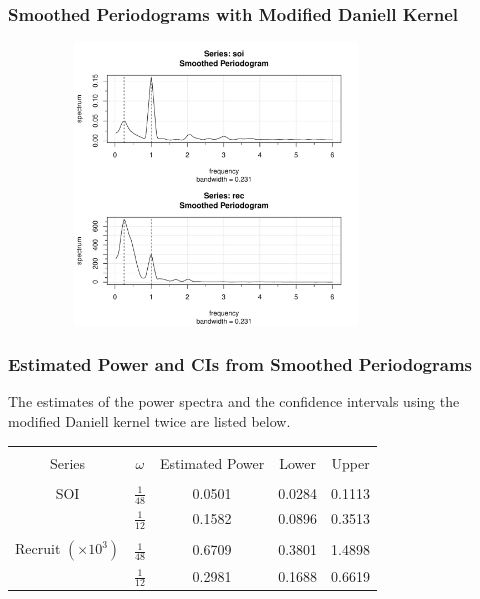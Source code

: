 \documentclass[%
xcolor=pdftex]{beamer}
\begin{document}
\begin{frame}
\frametitle{Smoothed Periodograms with Modified Daniell Kernel}

\includegraphics[width=110mm, height=75mm]{daniell.pdf}

\end{frame}

\begin{frame}
\frametitle{Estimated Power and CIs from Smoothed Periodograms}

The estimates of the power spectra and the confidence intervals using the modified Daniell kernel twice are listed below.

\begin{center}
\begin{tabular}{ccccc}
\hline \\
Series & $\omega$ & Estimated Power & Lower & Upper \\
\hline \\
SOI & $\frac{1}{48}$ & 0.0501 & 0.0284 & 0.1113\\
    & $\frac{1}{12}$ & 0.1582 & 0.0896 & 0.3513 \\
    \hline\\
Recruit $(\times 10^3)$ & $\frac{1}{48}$ & 0.6709 & 0.3801 & 1.4898 \\
                        & $\frac{1}{12}$ & 0.2981 & 0.1688 & 0.6619 \\
\hline
\end{tabular}
\end{center}

\end{frame}
\end{document}
